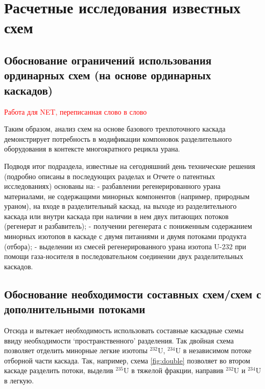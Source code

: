\section{Расчетные исследования известных схем}\label{sec:ch1/sec2}

\subsection{Обоснование ограничений использования ординарных схем (на основе ординарных каскадов)}\label{sec:ch1/sec3.1}
\textcolor{red}{Работа для NET, переписанная слово в слово}

Таким образом, анализ схем на основе базового трехпоточного каскада демонстрирует потребность в модификации компоновок разделительного оборудования в контексте многократного рецикла урана.

Подводя итог подраздела, известные на сегодняшний день  технические решения (подробно описаны в последующих разделах и Отчете о патентных исследованиях) основаны на:
-	разбавлении регенерированного урана материалами, не содержащими минорных компонентов (например, природным ураном), на входе в разделительный каскад, на выходе из разделительного каскада или внутри каскада при наличии в нем двух питающих потоков (регенерат и разбавитель);
-	получении регенерата с пониженным содержанием минорных изотопов в каскаде с двумя питаниями и двумя потоками продукта (отбора);
-	выделении из смесей регенерированного урана изотопа U-232 при помощи газа-носителя в последовательном соединении двух разделительных каскадов.

\subsection{Обоснование необходимости составных схем/схем с дополнительными потоками}\label{sec:ch1/sec3.1}
Отсюда и вытекает необходимость использовать составные каскадные схемы ввиду необходимости  `пространственного' разделения. Так двойная схема позволяет отделить минорные легкие изотопы $^{232}$U, $^{234}$U в независимом потоке отборной части каскада. Так, например, схема \ref{fig:double} позволяет во втором каскаде разделить потоки, выделив $^{235}$U в тяжелой фракции, направив $^{232}$U и $^{234}$U в легкую.

